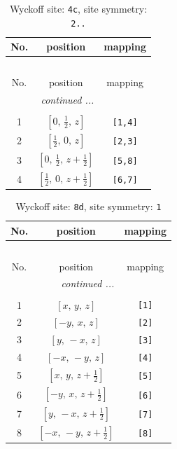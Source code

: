\documentclass[fleqn,8pt]{jsarticle}
\begin{document}
\renewcommand{\arraystretch}{1.2}
\begin{longtable}{ccc}
\caption{Wyckoff site: {\tt 4c}, site symmetry: {\tt 2..}}
 \\
 \hline \hline
No. & position & mapping \\ \hline \endfirsthead

\multicolumn{2}{l}{\tablename\ \thetable{}} \\
 \hline \hline
No. & position & mapping \\ \hline \endhead

 \hline \hline
\multicolumn{2}{r}{\footnotesize\it continued ...} \\ \endfoot

 \hline \hline
\multicolumn{2}{r}{} \\ \endlastfoot

1 & $\left[ 0,\, \frac{1}{2},\, z \right]$ & {\tt [1,4]} \\ \hline
2 & $\left[ \frac{1}{2},\, 0,\, z \right]$ & {\tt [2,3]} \\ \hline
3 & $\left[ 0,\, \frac{1}{2},\, z + \frac{1}{2} \right]$ & {\tt [5,8]} \\ \hline
4 & $\left[ \frac{1}{2},\, 0,\, z + \frac{1}{2} \right]$ & {\tt [6,7]} \\
\end{longtable}
\renewcommand{\arraystretch}{1.2}
\begin{longtable}{ccc}
\caption{Wyckoff site: {\tt 8d}, site symmetry: {\tt 1}}
 \\
 \hline \hline
No. & position & mapping \\ \hline \endfirsthead

\multicolumn{2}{l}{\tablename\ \thetable{}} \\
 \hline \hline
No. & position & mapping \\ \hline \endhead

 \hline \hline
\multicolumn{2}{r}{\footnotesize\it continued ...} \\ \endfoot

 \hline \hline
\multicolumn{2}{r}{} \\ \endlastfoot

1 & $\left[ x,\, y,\, z \right]$ & {\tt [1]} \\ \hline
2 & $\left[ - y,\, x,\, z \right]$ & {\tt [2]} \\ \hline
3 & $\left[ y,\, - x,\, z \right]$ & {\tt [3]} \\ \hline
4 & $\left[ - x,\, - y,\, z \right]$ & {\tt [4]} \\ \hline
5 & $\left[ x,\, y,\, z + \frac{1}{2} \right]$ & {\tt [5]} \\ \hline
6 & $\left[ - y,\, x,\, z + \frac{1}{2} \right]$ & {\tt [6]} \\ \hline
7 & $\left[ y,\, - x,\, z + \frac{1}{2} \right]$ & {\tt [7]} \\ \hline
8 & $\left[ - x,\, - y,\, z + \frac{1}{2} \right]$ & {\tt [8]} \\
\end{longtable}
\end{document}
